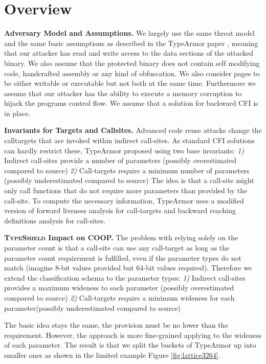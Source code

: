 \section{Overview}
\label{chapter:TypeShild Overview}

\textbf{Adversary Model and Assumptions.}
\label{Adversary Model}
We largely use the same threat model and the same basic assumptions as described in the TypeArmor 
paper \cite{veen:typearmor}, meaning that our attacker has read and write access to the data 
sections of the attacked binary.  We also assume that the protected binary does not contain 
self modifying code, handcrafted assembly or any kind of obfuscation. We also consider pages 
to be either writable or executable but not both at the same time. Furthermore we assume 
that our attacker has the ability to execute a memory corruption to hijack the programs 
control flow. We assume that a solution for backward CFI is in place.

\textbf{Invariants for Targets and Callsites.}
\label{Invariants for Targets and Callsites}
Advanced code reuse attacks change the calltargets that are invoked within indirect 
call-sites. As standard CFI solutions can hardly restrict these, TypeArmor proposed using two base invariants:
\textit{1)} Indirect call-sites provide a number of parameters (possibly overestimated compared to source)
\textit{2)} Call-targets require a minimum number of parameters (possibly underestimated compared to source)
The idea is that a call-site might only call functions that do not require more parameters than provided by the call-site. 
To compute the necessary information, TypeArmor uses a modified version of forward liveness analysis for call-targets and 
backward reaching definitions analysis for call-sites.

\textbf{\textsc{TypeShield} Impact on COOP.}
\label{TypeShild Impact on COOP}
The problem with relying solely on the parameter count is that a call-site can use any call-target as long as the parameter count 
requirement is fulfilled, even if the parameter types do not match (imagine 8-bit values provided but 64-bit values required). 
Therefore we extend the classification schema to the parameter types:
\textit{1)} Indirect call-sites provides a maximum wideness to each parameter (possibly overestimated compared to source)
\textit{2)} Call-targets require a minimum wideness for each parameter(possibly underestimated compared to source)

The basic idea stays the same, the provision must be no lower than the requirement. However, the approach is more fine-grained 
applying to the wideness of each parameter. The result is that we split the buckets of TypeArmor up into smaller ones as shown in the limited example Figure \ref{fig:lattice3264}.
